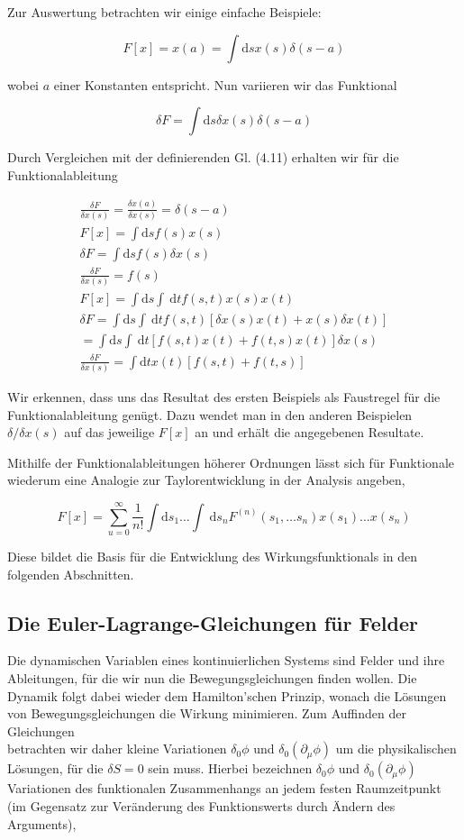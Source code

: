 \documentclass[10pt, letterpaper]{article}
\begin{document}
Zur Auswertung betrachten wir einige einfache Beispiele:

$$
F[x]=x(a)=\int \mathrm{d} s x(s) \delta(s-a)
$$

wobei $a$ einer Konstanten entspricht. Nun variieren wir das Funktional

$$
\delta F=\int \mathrm{d} s \delta x(s) \delta(s-a)
$$

Durch Vergleichen mit der definierenden Gl. (4.11) erhalten wir für die Funktionalableitung

$$
\begin{gathered}
\frac{\delta F}{\delta x(s)}=\frac{\delta x(a)}{\delta x(s)}=\delta(s-a) \\
F[x]=\int \mathrm{d} s f(s) x(s) \\
\delta F=\int \mathrm{d} s f(s) \delta x(s) \\
\frac{\delta F}{\delta x(s)}=f(s) \\
F[x]=\int \mathrm{d} s \int \mathrm{~d} t f(s, t) x(s) x(t) \\
\delta F=\int \mathrm{d} s \int \mathrm{~d} t f(s, t)[\delta x(s) x(t)+x(s) \delta x(t)] \\
=\int \mathrm{d} s \int \mathrm{~d} t[f(s, t) x(t)+f(t, s) x(t)] \delta x(s) \\
\frac{\delta F}{\delta x(s)}=\int \mathrm{d} t x(t)[f(s, t)+f(t, s)]
\end{gathered}
$$

Wir erkennen, dass uns das Resultat des ersten Beispiels als Faustregel für die Funktionalableitung genügt. Dazu wendet man in den anderen Beispielen $\delta / \delta x(s)$ auf das jeweilige $F[x]$ an und erhält die angegebenen Resultate.

Mithilfe der Funktionalableitungen höherer Ordnungen lässt sich für Funktionale wiederum eine Analogie zur Taylorentwicklung in der Analysis angeben,

$$
F[x]=\sum_{u=0}^{\infty} \frac{1}{n!} \int \mathrm{d} s_{1} \ldots \int \mathrm{~d} s_{n} F^{(n)}\left(s_{1}, \ldots s_{n}\right) x\left(s_{1}\right) \ldots x\left(s_{n}\right)
$$

Diese bildet die Basis für die Entwicklung des Wirkungsfunktionals in den folgenden Abschnitten.


\pagebreak

\subsection{Die Euler-Lagrange-Gleichungen für Felder}
Die dynamischen Variablen eines kontinuierlichen Systems sind Felder und ihre Ableitungen, für die wir nun die Bewegungsgleichungen finden wollen. Die Dynamik folgt dabei wieder dem Hamilton'schen Prinzip, wonach die Lösungen von Bewegungsgleichungen die Wirkung minimieren. Zum Auffinden der Gleichungen\\
betrachten wir daher kleine Variationen $\delta_{0} \phi$ und $\delta_{0}\left(\partial_{\mu} \phi\right)$ um die physikalischen Lösungen, für die $\delta S=0$ sein muss. Hierbei bezeichnen $\delta_{0} \phi$ und $\delta_{0}\left(\partial_{\mu} \phi\right)$ Variationen des funktionalen Zusammenhangs an jedem festen Raumzeitpunkt (im Gegensatz zur Veränderung des Funktionswerts durch Ändern des Arguments),
\end{document}
